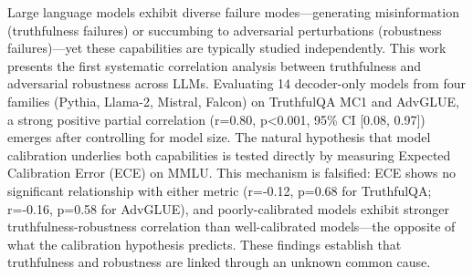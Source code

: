 
Large language models exhibit diverse failure modes---generating misinformation (truthfulness failures) or succumbing to adversarial perturbations (robustness failures)---yet these capabilities are typically studied independently. This work presents the first systematic correlation analysis between truthfulness and adversarial robustness across LLMs. Evaluating 14 decoder-only models from four families (Pythia, Llama-2, Mistral, Falcon) on TruthfulQA MC1 and AdvGLUE, a strong positive partial correlation (r=0.80, p<0.001, 95\% CI [0.08, 0.97]) emerges after controlling for model size. The natural hypothesis that model calibration underlies both capabilities is tested directly by measuring Expected Calibration Error (ECE) on MMLU. This mechanism is falsified: ECE shows no significant relationship with either metric (r=-0.12, p=0.68 for TruthfulQA; r=-0.16, p=0.58 for AdvGLUE), and poorly-calibrated models exhibit stronger truthfulness-robustness correlation than well-calibrated models---the opposite of what the calibration hypothesis predicts. These findings establish that truthfulness and robustness are linked through an unknown common cause.
